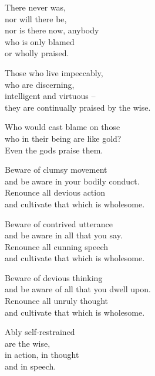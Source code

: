 There never was,\\
nor will there be,\\
nor is there now, anybody\\
who is only blamed\\
or wholly praised.


Those who live impeccably,\\
who are discerning,\\
intelligent and virtuous --\\
they are continually praised by the wise.


Who would cast blame on those\\
who in their being are like gold?\\
Even the gods praise them.


Beware of clumsy movement\\
and be aware in your bodily conduct.\\
Renounce all devious action\\
and cultivate that which is wholesome.


Beware of contrived utterance\\
and be aware in all that you say.\\
Renounce all cunning speech\\
and cultivate that which is wholesome.


Beware of devious thinking\\
and be aware of all that you dwell upon.\\
Renounce all unruly thought\\
and cultivate that which is wholesome.


Ably self-restrained\\
are the wise,\\
in action, in thought\\
and in speech.

